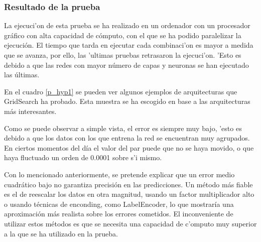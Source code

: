 \subsubsection*{Resultado de la prueba}
La ejecuci'on de esta prueba se ha realizado en un ordenador con un procesador gráfico con alta capacidad de cómputo, con el que se ha podido paralelizar la ejecución. 
El tiempo que tarda en ejecutar cada combinaci'on es mayor a medida que se avanza, por ello, las 'ultimas pruebas retrasaron la ejecuci'on. 'Esto es debido a que las redes con mayor número de capas y neuronas se han ejecutado las últimas. 


En el cuadro \ref{p_hyp1} se pueden ver algunos ejemplos de arquitecturas que GridSearch ha probado. Esta muestra se ha escogido en base a las arquitecturas más interesantes. 

Como se puede observar a simple vista, el error es siempre muy bajo, 'esto es debido a que los datos con los que entrena la red se encuentran muy agrupados. En ciertos momentos del día el valor del par puede que no se haya movido, o que haya fluctuado un orden de 0.0001 sobre s'i mismo. 

\clearpage

Con lo mencionado anteriormente, se pretende explicar que un error medio cuadrático bajo no garantiza precisión en las predicciones. Un método más fiable es el de reescalar los datos en otra magnitud, usando un factor multiplicador alto o usando técnicas de enconding, como LabelEncoder, lo que mostraría una aproximación más realista sobre los errores cometidos. El inconveniente de utilizar estos métodos es que se necesita una capacidad de c'omputo muy superior a la que se ha utilizado en la prueba. 



